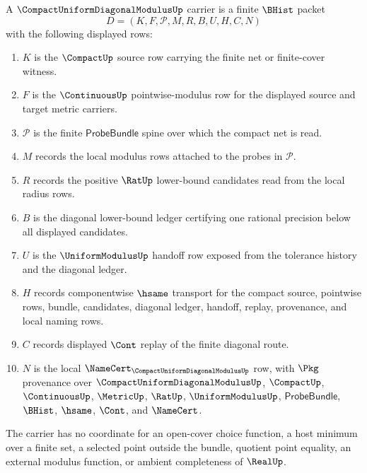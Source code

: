 \begin{definition}
\label{def:compact-uniform-diagonal-modulus-carrier}
A $\CompactUniformDiagonalModulusUp$ carrier is a finite $\BHist$ packet
$$
D=(K,F,\mathcal{P},M,R,B,U,H,C,N)
$$
with the following displayed rows:
\begin{enumerate}
\item $K$ is the $\CompactUp$ source row carrying the finite net or finite-cover witness.
\item $F$ is the $\ContinuousUp$ pointwise-modulus row for the displayed source and target metric carriers.
\item $\mathcal{P}$ is the finite $\mathsf{ProbeBundle}$ spine over which the compact net is read.
\item $M$ records the local modulus rows attached to the probes in $\mathcal{P}$.
\item $R$ records the positive $\RatUp$ lower-bound candidates read from the local radius rows.
\item $B$ is the diagonal lower-bound ledger certifying one rational precision below all displayed candidates.
\item $U$ is the $\UniformModulusUp$ handoff row exposed from the tolerance history and the diagonal ledger.
\item $H$ records componentwise $\hsame$ transport for the compact source, pointwise rows, bundle, candidates, diagonal ledger, handoff, replay, provenance, and local naming rows.
\item $C$ records displayed $\Cont$ replay of the finite diagonal route.
\item $N$ is the local $\NameCert_{\CompactUniformDiagonalModulusUp}$ row, with $\Pkg$ provenance over $\CompactUniformDiagonalModulusUp$, $\CompactUp$, $\ContinuousUp$, $\MetricUp$, $\RatUp$, $\UniformModulusUp$, $\mathsf{ProbeBundle}$, $\BHist$, $\hsame$, $\Cont$, and $\NameCert$.
\end{enumerate}
The carrier has no coordinate for an open-cover choice function, a host minimum over a finite set, a selected point outside the bundle, quotient point equality, an external modulus function, or ambient completeness of $\RealUp$.
\end{definition}

